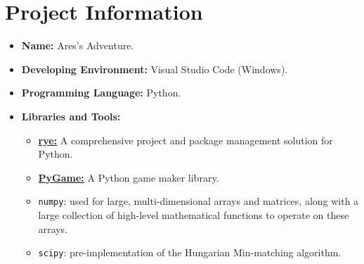 \section{Project Information}
\begin{itemize}
  \item \textbf{Name:} Ares's Adventure.
  \item \textbf{Developing Environment:} Visual Studio Code (Windows).
  \item \textbf{Programming Language:} Python.
  \item \textbf{Libraries and Tools:}
        \begin{itemize}
          \item \href{https://rye.astral.sh/}{\textbf{rye:}} A comprehensive project and package management solution for Python.
          \item \href{https://www.pygame.org/docs/}{\textbf{PyGame:}} A Python game maker library.
          \item \verb|numpy|: used for large, multi-dimensional arrays and matrices, along with a large collection of high-level mathematical functions to operate on these arrays.
          \item \verb|scipy|: pre-implementation of the Hungarian Min-matching algorithm.
        \end{itemize}
\end{itemize}
